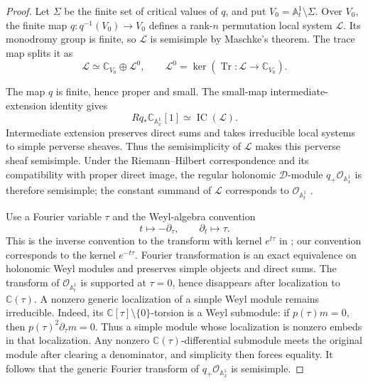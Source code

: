 \documentclass[11pt]{article}
\numberwithin{equation}{section}
\theoremstyle{definition}
\theoremstyle{remark}
\newcommand{\C}{\mathbb C}
\newcommand{\Aone}{\mathbb A^1}
\newcommand{\Tr}{\operatorname{Tr}}
\newcommand{\Lcal}{\mathcal L}
\newcommand{\Dmod}{\mathcal D}
\newcommand{\Ocal}{\mathcal O}
\begin{document}
\begin{proof}
Let $\Sigma$ be the finite set of critical values of $q$, and put
$V_0=\Aone_t\setminus\Sigma$.  Over $V_0$, the finite map
$q:q^{-1}(V_0)\to V_0$ defines a rank-$n$ permutation local system
$\Lcal$.  Its monodromy group is finite, so $\Lcal$ is semisimple by
Maschke's theorem.  The trace map splits it as
\[
  \Lcal\simeq\C_{V_0}\oplus\Lcal^0,
  \qquad \Lcal^0=\ker(\Tr:\Lcal\to\C_{V_0}).
\]

The map $q$ is finite, hence proper and small.  The small-map
intermediate-extension identity
\cite[Remark~4.2.4]{deCataldoMigliorini} gives
\begin{equation}\label{eq:small-map}
  Rq_*\C_{\Aone_x}[1]\simeq\operatorname{IC}(\Lcal).
\end{equation}
Intermediate extension preserves direct sums and takes irreducible local
systems to simple perverse sheaves.  Thus the semisimplicity of $\Lcal$
makes this perverse sheaf semisimple.  Under the Riemann--Hilbert
correspondence and
its compatibility with proper direct image, the regular holonomic
$\Dmod$-module $q_+\Ocal_{\Aone_x}$ is therefore semisimple; the constant
summand of $\Lcal$ corresponds to $\Ocal_{\Aone_t}$
\cite{HTT}.

Use a Fourier variable $\tau$ and the Weyl-algebra convention
\begin{equation}\label{eq:Fourier-convention}
  t\longmapsto-\partial_\tau,
  \qquad \partial_t\longmapsto\tau.
\end{equation}
This is the inverse convention to the transform with kernel $e^{t\tau}$
in \cite[\S1.3.b]{SabbahFourier}; our convention corresponds to the
kernel $e^{-t\tau}$.
Fourier transformation is an exact equivalence on holonomic Weyl modules
and preserves simple objects and direct sums.  The transform of
$\Ocal_{\Aone_t}$ is supported at $\tau=0$, hence disappears after
localization to $\C(\tau)$.  A nonzero generic localization of a simple
Weyl module remains irreducible.  Indeed, its
$\C[\tau]\setminus\{0\}$-torsion is a Weyl submodule: if
$p(\tau)m=0$, then $p(\tau)^2\partial_\tau m=0$.  Thus a simple module
whose localization is nonzero embeds in that localization.  Any nonzero
$\C(\tau)$-differential submodule meets the original module after clearing
a denominator, and simplicity then forces equality.  It follows that the
generic Fourier transform of $q_+\Ocal_{\Aone_x}$ is semisimple.


\end{proof}
\end{document}
